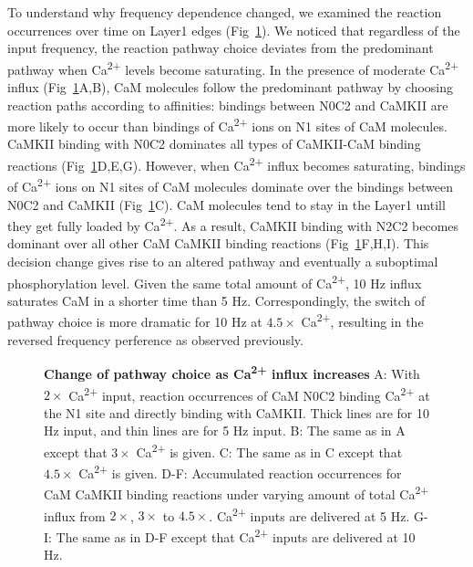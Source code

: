\documentclass[10pt,letterpaper]{article}
\begin{document}
To understand why frequency dependence changed, we examined the reaction occurrences over time on Layer1 edges (Fig~\ref{fig11}). We noticed that regardless of the input frequency, the reaction pathway choice deviates from the predominant pathway when Ca\textsuperscript{2+} levels become saturating. In the presence of moderate Ca\textsuperscript{2+} influx (Fig~\ref{fig11}A,B), CaM molecules follow the predominant pathway by choosing reaction paths according to affinities: bindings between N0C2 and CaMKII are more likely to occur than bindings of Ca\textsuperscript{2+} ions on N1 sites of CaM molecules. CaMKII binding with N0C2 dominates all types of CaMKII-CaM binding reactions (Fig~\ref{fig11}D,E,G). However, when Ca\textsuperscript{2+} influx becomes saturating, bindings of Ca\textsuperscript{2+} ions on N1 sites of CaM molecules dominate over the bindings between N0C2 and CaMKII (Fig~\ref{fig11}C). CaM molecules tend to stay in the Layer1 untill they get fully loaded by Ca\textsuperscript{2+}. As a result, CaMKII binding with N2C2 becomes dominant over all other CaM CaMKII binding reactions (Fig~\ref{fig11}F,H,I). This decision change gives rise to an altered pathway and eventually a suboptimal phosphorylation level. Given the same total amount of Ca\textsuperscript{2+}, 10 Hz influx saturates CaM in a shorter time than 5 Hz. Correspondingly, the switch of pathway choice is more dramatic for 10 Hz at $4.5\times$ Ca\textsuperscript{2+}, resulting in the reversed frequency perference as observed previously. 

\begin{figure}[!h]
	\caption{{\bf Change of pathway choice as Ca\textsuperscript{2+} influx increases}
	A: With $2\times$ Ca\textsuperscript{2+} input, reaction occurrences of CaM N0C2 binding Ca\textsuperscript{2+} at the N1 site and directly binding with CaMKII. Thick lines are for 10 Hz input, and thin lines are for 5 Hz input. B: The same as in A except that $3\times$ Ca\textsuperscript{2+} is given. C: The same as in C except that $4.5\times$ Ca\textsuperscript{2+} is given. D-F: Accumulated reaction occurrences for CaM CaMKII binding reactions under varying amount of total Ca\textsuperscript{2+} influx from $2\times$, $3\times$ to $4.5\times$. Ca\textsuperscript{2+} inputs are delivered at 5 Hz. G-I: The same as in D-F except that Ca\textsuperscript{2+} inputs are delivered at 10 Hz.
	}
\label{fig11}
\end{figure}
\end{document}
